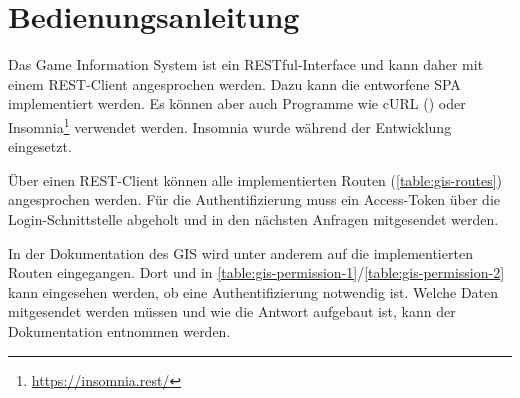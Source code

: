 \section{Bedienungsanleitung}

Das Game Information System ist ein RESTful-Interface und kann daher mit einem REST-Client angesprochen werden. Dazu kann die entworfene SPA implementiert werden. Es können aber auch Programme wie cURL () oder Insomnia\footnote{\url{https://insomnia.rest/}} verwendet werden. Insomnia wurde während der Entwicklung eingesetzt.

Über einen REST-Client können alle implementierten Routen (\autoref{table:gis-routes}) angesprochen werden. Für die Authentifizierung muss ein Access-Token über die Login-Schnittstelle abgeholt und in den nächsten Anfragen mitgesendet werden.

In der Dokumentation des GIS wird unter anderem auf die implementierten Routen eingegangen. Dort und in \autoref{table:gis-permission-1}/\ref{table:gis-permission-2} kann eingesehen werden, ob eine Authentifizierung notwendig ist. Welche Daten mitgesendet werden müssen und wie die Antwort aufgebaut ist, kann der Dokumentation entnommen werden.